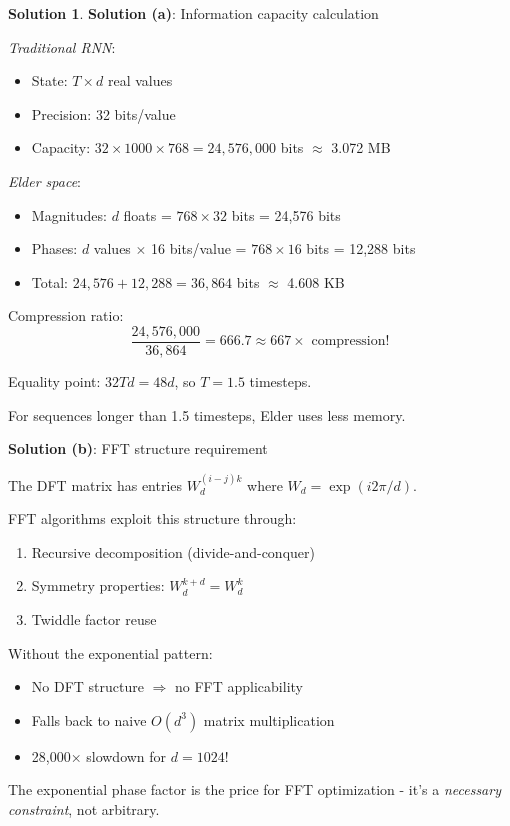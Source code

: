 \documentclass[12pt,a4paper]{article}
\theoremstyle{definition}
\newtheorem{solution}{Solution}[section]
\theoremstyle{remark}
\begin{document}
\begin{solution}
\textbf{Solution (a)}: Information capacity calculation

\textit{Traditional RNN}:
\begin{itemize}
\item State: $T \times d$ real values
\item Precision: 32 bits/value
\item Capacity: $32 \times 1000 \times 768 = 24,576,000$ bits $\approx$ 3.072 MB
\end{itemize}

\textit{Elder space}:
\begin{itemize}
\item Magnitudes: $d$ floats = $768 \times 32$ bits = 24,576 bits
\item Phases: $d$ values $\times$ 16 bits/value = $768 \times 16$ bits = 12,288 bits
\item Total: $24,576 + 12,288 = 36,864$ bits $\approx$ 4.608 KB
\end{itemize}

Compression ratio:
$$\frac{24,576,000}{36,864} = 666.7 \approx 667\times \text{ compression!}$$

Equality point: $32Td = 48d$, so $T = 1.5$ timesteps.

For sequences longer than 1.5 timesteps, Elder uses less memory.

\textbf{Solution (b)}: FFT structure requirement

The DFT matrix has entries $W_d^{(i-j)k}$ where $W_d = \exp(i2\pi/d)$.

FFT algorithms exploit this structure through:
\begin{enumerate}
\item Recursive decomposition (divide-and-conquer)
\item Symmetry properties: $W_d^{k+d} = W_d^k$
\item Twiddle factor reuse
\end{enumerate}

Without the exponential pattern:
\begin{itemize}
\item No DFT structure $\Rightarrow$ no FFT applicability
\item Falls back to naive $O(d^3)$ matrix multiplication
\item 28,000× slowdown for $d=1024$!
\end{itemize}

The exponential phase factor is the price for FFT optimization - it's a \textit{necessary constraint}, not arbitrary.


\end{solution}
\end{document}
